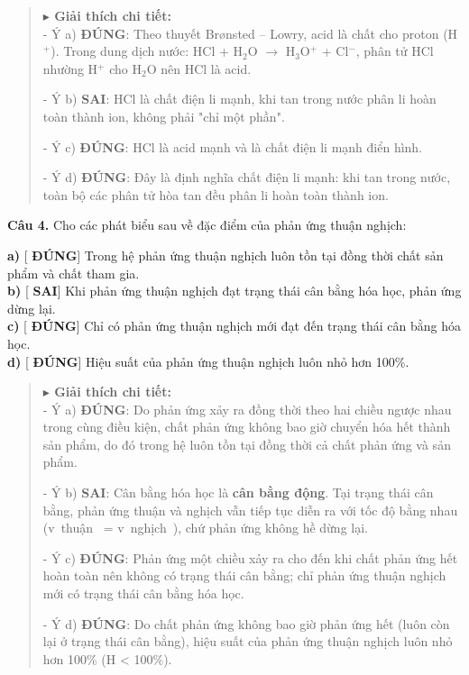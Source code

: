 \documentclass[11pt,a4paper]{article}
\begin{document}
\begin{quote}\small
{\color{myBlue}\textbf{$\blacktriangleright$ Giải thích chi tiết:}}\\
- Ý a) \textbf{ĐÚNG}: Theo thuyết Brønsted – Lowry, acid là chất cho proton (H$^{+}$). Trong dung dịch nước: HCl + H$_{2}$O $\longrightarrow$ H$_{3}$O$^{+}$ + Cl$^{-}$, phân tử HCl nhường H$^{+}$ cho H$_{2}$O nên HCl là acid.

- Ý b) \textbf{SAI}: HCl là chất điện li mạnh, khi tan trong nước phân li hoàn toàn thành ion, không phải "chỉ một phần".

- Ý c) \textbf{ĐÚNG}: HCl là acid mạnh và là chất điện li mạnh điển hình.

- Ý d) \textbf{ĐÚNG}: Đây là định nghĩa chất điện li mạnh: khi tan trong nước, toàn bộ các phân tử hòa tan đều phân li hoàn toàn thành ion.
\end{quote}
\vspace{2pt}

\textbf{Câu 4.} Cho các phát biểu sau về đặc điểm của phản ứng thuận nghịch:

\textbf{a)} [\textbf{\color{red} ĐÚNG}] Trong hệ phản ứng thuận nghịch luôn tồn tại đồng thời chất sản phẩm và chất tham gia.\\
\textbf{b)} [\textbf{\color{mySub} SAI}] Khi phản ứng thuận nghịch đạt trạng thái cân bằng hóa học, phản ứng dừng lại.\\
\textbf{c)} [\textbf{\color{red} ĐÚNG}] Chỉ có phản ứng thuận nghịch mới đạt đến trạng thái cân bằng hóa học.\\
\textbf{d)} [\textbf{\color{red} ĐÚNG}] Hiệu suất của phản ứng thuận nghịch luôn nhỏ hơn 100\%.\\

\begin{quote}\small
{\color{myBlue}\textbf{$\blacktriangleright$ Giải thích chi tiết:}}\\
- Ý a) \textbf{ĐÚNG}: Do phản ứng xảy ra đồng thời theo hai chiều ngược nhau trong cùng điều kiện, chất phản ứng không bao giờ chuyển hóa hết thành sản phẩm, do đó trong hệ luôn tồn tại đồng thời cả chất phản ứng và sản phẩm.

- Ý b) \textbf{SAI}: Cân bằng hóa học là \textbf{cân bằng động}. Tại trạng thái cân bằng, phản ứng thuận và nghịch vẫn tiếp tục diễn ra với tốc độ bằng nhau (v~thuận~ = v~nghịch~), chứ phản ứng không hề dừng lại.

- Ý c) \textbf{ĐÚNG}: Phản ứng một chiều xảy ra cho đến khi chất phản ứng hết hoàn toàn nên không có trạng thái cân bằng; chỉ phản ứng thuận nghịch mới có trạng thái cân bằng hóa học.

- Ý d) \textbf{ĐÚNG}: Do chất phản ứng không bao giờ phản ứng hết (luôn còn lại ở trạng thái cân bằng), hiệu suất của phản ứng thuận nghịch luôn nhỏ hơn 100\% (H < 100\%).
\end{quote}
\vspace{2pt}
\end{document}
